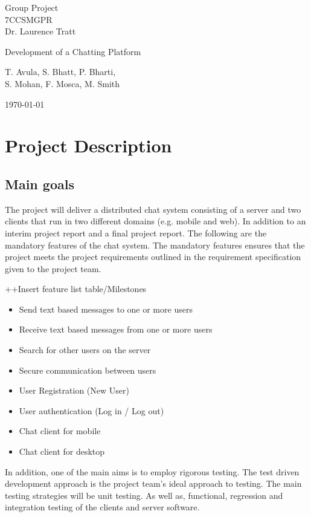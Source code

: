 \documentclass[11pt,a4paper]{article}
\begin{document}
\begin{center}
\large{Group Project\\7CCSMGPR} \\
\large{Dr. Laurence Tratt}

\bigskip

\Huge{Development of a Chatting Platform}

\bigskip

\Large{T. Avula, S. Bhatt, P. Bharti, \\S. Mohan, F. Mosca, M. Smith} \\

\bigskip

\large{\today}
\end{center}

\bigskip


\section{Project Description}
\subsection{Main goals}
The project will deliver a distributed chat system consisting of a server and two clients that run in two different domains (e.g. mobile and web). In addition to an interim project report and a final project report. The following are the mandatory features of the chat system. The mandatory features ensures that the project meets the project requirements outlined in the requirement specification given to the project team.

++Insert feature list table/Milestones
\begin{itemize}
\item Send text based messages to one or more users
\item Receive text based messages from one or more users
\item Search for other users on the server
\item Secure communication between users
\item User Registration (New User)
\item User authentication (Log in / Log out)
\item Chat client for mobile
\item Chat client for desktop
\end{itemize}


In addition, one of the main aims is to employ rigorous testing. The test driven development approach is the project team’s ideal approach to testing. The main testing strategies will be unit testing. As well as, functional, regression and integration testing of the clients and server software.
\end{document}
